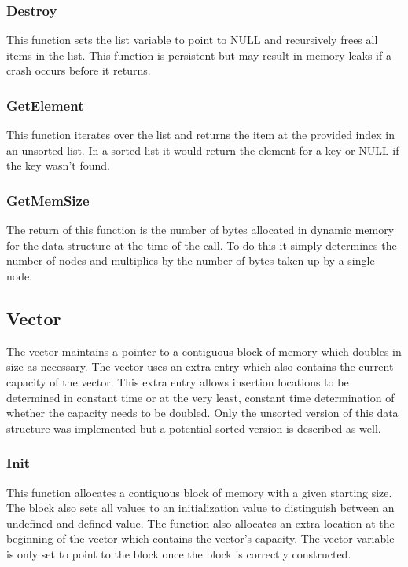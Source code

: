 \documentclass[twocolumn]{article}
\begin{document}
\subsubsection{Destroy}

This function sets the list variable to point to NULL and recursively frees all
items in the list. This function is persistent but may result in memory leaks if
a crash occurs before it returns.

\subsubsection{GetElement}

This function iterates over the list and returns the item at the provided index
in an unsorted list. In a sorted list it would return the element for a key or
NULL if the key wasn't found.

\subsubsection{GetMemSize}

The return of this function is the number of bytes allocated in dynamic memory
for the data structure at the time of the call. To do this it simply determines
the number of nodes and multiplies by the number of bytes taken up by a single
node.

\subsection{Vector}

The vector maintains a pointer to a contiguous block of memory which doubles in
size as necessary. The vector uses an extra entry which also contains the
current capacity of the vector. This extra entry allows insertion locations to
be determined in constant time or at the very least, constant time determination
of whether the capacity needs to be doubled. Only the unsorted version of this
data structure was implemented but a potential sorted version is described as
well.

\subsubsection{Init}

This function allocates a contiguous block of memory with a given starting size.
The block also sets all values to an initialization value to distinguish between
an undefined and defined value. The function also allocates an extra location at
the beginning of the vector which contains the vector's capacity. The vector
variable is only set to point to the block once the block is correctly
constructed.
\end{document}
